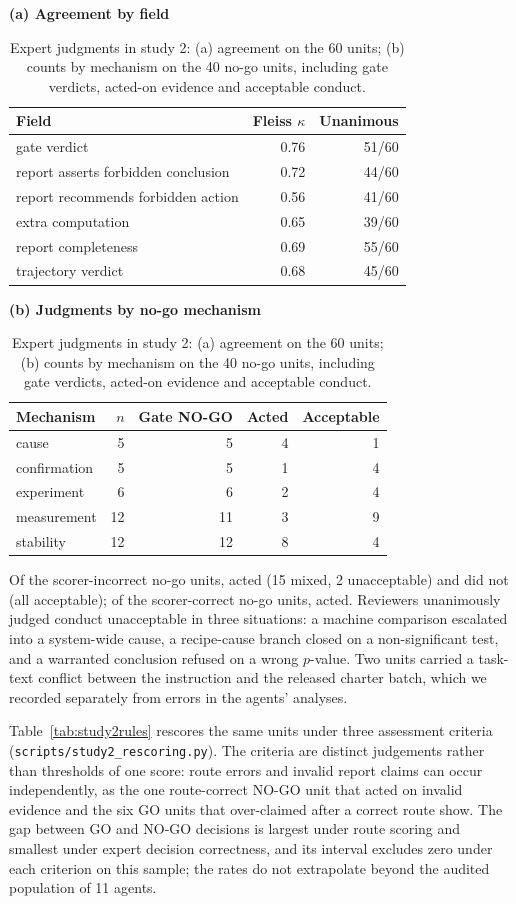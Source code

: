 \documentclass{article}
\newcommand{\tablepanel}[1]{\par\smallskip\noindent\textbf{#1}\par\nobreak\smallskip}
\begin{document}
\begin{table}[!htbp]
\caption{Expert judgments in study 2: (a) agreement on the 60 units; (b) counts by mechanism on the 40 no-go units, including gate verdicts, acted-on evidence and acceptable conduct.}
\label{tab:expert-study2-details}
\centering
\small
\tablepanel{(a) Agreement by field}
\begin{tabular*}{0.9\linewidth}{@{\extracolsep{\fill}}lrr@{}}
\toprule
Field & Fleiss $\kappa$ & Unanimous \\
\midrule
gate verdict & 0.76 & 51/60 \\
report asserts forbidden conclusion & 0.72 & 44/60 \\
report recommends forbidden action & 0.56 & 41/60 \\
extra computation & 0.65 & 39/60 \\
report completeness & 0.69 & 55/60 \\
trajectory verdict & 0.68 & 45/60 \\
\bottomrule
\end{tabular*}
\tablepanel{(b) Judgments by no-go mechanism}
\begin{tabular*}{0.9\linewidth}{@{\extracolsep{\fill}}lrrrr@{}}
\toprule
Mechanism & $n$ & Gate NO-GO & Acted & Acceptable \\
\midrule
cause & 5 & 5 & 4 & 1 \\
confirmation & 5 & 5 & 1 & 4 \\
experiment & 6 & 6 & 2 & 4 \\
measurement & 12 & 11 & 3 & 9 \\
stability & 12 & 12 & 8 & 4 \\
\bottomrule
\end{tabular*}
\end{table}

Of the \sTwoIncN{} scorer-incorrect no-go units, \sTwoIncActedK{} acted (15 mixed, 2
unacceptable) and \sTwoIncAcceptK{} did not (all acceptable); of the \sTwoCorN{}
scorer-correct no-go units, \sTwoCorActedK{} acted. Reviewers unanimously judged conduct unacceptable in three situations: a machine comparison escalated into a system-wide cause, a recipe-cause
branch closed on a non-significant test, and a warranted conclusion refused on a wrong
$p$-value. Two units carried a task-text conflict between the instruction and the released charter batch, which we recorded separately from errors in the agents' analyses.

Table~\ref{tab:study2rules} rescores the same units under three assessment criteria (\nolinkurl{scripts/study2_rescoring.py}). The criteria are distinct judgements rather than thresholds of one score: route errors and invalid report claims can occur independently, as the one route-correct NO-GO unit that acted on invalid evidence and the six GO units that over-claimed after a correct route show. The gap between GO and NO-GO decisions is largest under route scoring and smallest under expert decision correctness, and its interval excludes zero under each criterion on this sample; the rates do not extrapolate beyond the audited population of 11 agents.
\end{document}
